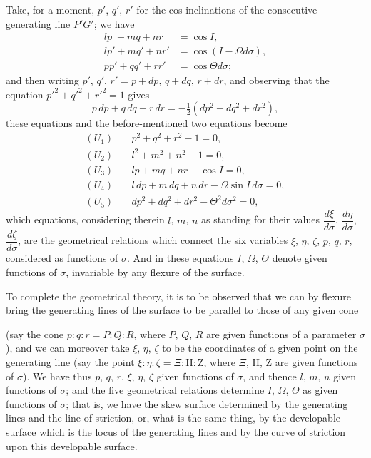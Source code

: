 \documentclass[11pt,a4paper]{book}
\begin{document}
Take, for a moment, $p'$, $q'$, $r'$ for the cos-inclinations of the consecutive generating line $P'G'$; we have
\begin{align*}
lp\; + mq + nr &= \cos I, \\
lp' + mq' + nr' &= \cos(I - \Omega d\sigma), \\
pp' + qq' + rr' &= \cos \Theta d\sigma;
\end{align*}
and then writing $p'$, $q'$, $r' = p + dp$, $q + dq$, $r + dr$, and observing that the equation $p'^2 + q'^2 + r'^2 = 1$ gives
\[
p\,dp + q\,dq + r\,dr = -\tfrac{1}{2}(dp^2 + dq^2 + dr^2),
\]
these equations and the before-mentioned two equations become
\begin{align*}
(U_1)\quad &p^2 + q^2 + r^2 - 1 = 0, \\
(U_2)\quad &l^2 + m^2 + n^2 - 1 = 0, \\
(U_3)\quad &lp + mq + nr - \cos I = 0, \\
(U_4)\quad &l\,dp + m\,dq + n\,dr - \Omega \sin I\,d\sigma = 0, \\
(U_5)\quad &dp^2 + dq^2 + dr^2 - \Theta^2 d\sigma^2 = 0,
\end{align*}
which equations, considering therein $l$, $m$, $n$ as standing for their values $\dfrac{d\xi}{d\sigma}$, $\dfrac{d\eta}{d\sigma}$, $\dfrac{d\zeta}{d\sigma}$, are the geometrical relations which connect the six variables $\xi$, $\eta$, $\zeta$, $p$, $q$, $r$, considered as functions of $\sigma$. And in these equations $I$, $\Omega$, $\Theta$ denote given functions of $\sigma$, invariable by any flexure of the surface.

To complete the geometrical theory, it is to be observed that we can by flexure bring the generating lines of the surface to be parallel to those of any given cone

\newpage
\noindent (say the cone $p : q : r = P : Q : R$, where $P$, $Q$, $R$ are given functions of a parameter $\sigma$), and we can moreover take $\xi$, $\eta$, $\zeta$ to be the coordinates of a given point on the generating line (say the point $\xi : \eta : \zeta = \Xi : \mathrm{H} : \mathrm{Z}$, where $\Xi$, $\mathrm{H}$, $\mathrm{Z}$ are given functions of $\sigma$). We have thus $p$, $q$, $r$, $\xi$, $\eta$, $\zeta$ given functions of $\sigma$, and thence $l$, $m$, $n$ given functions of $\sigma$; and the five geometrical relations determine $I$, $\Omega$, $\Theta$ as given functions of $\sigma$; that is, we have the skew surface determined by the generating lines and the line of striction, or, what is the same thing, by the developable surface which is the locus of the generating lines and by the curve of striction upon this developable surface.
\end{document}
